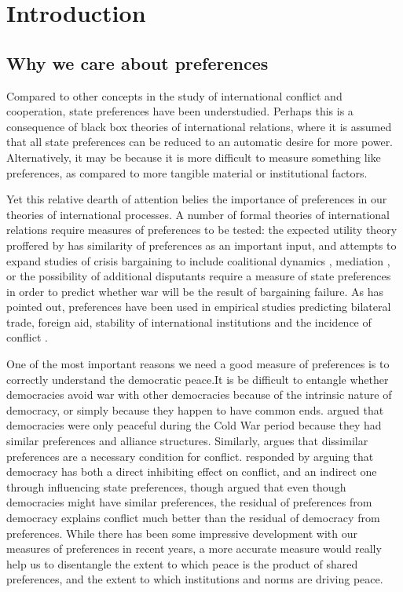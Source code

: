 \setcounter{section}{1}

\section{Introduction}

\subsection{Why we care about preferences}

Compared to other concepts in the study of international conflict and cooperation, state preferences have been understudied. Perhaps this is a consequence of black box theories of international relations, where it is assumed that all state preferences can be reduced to an automatic desire for more power. Alternatively, it may be because it is more difficult to measure something like preferences, as compared to more tangible material or institutional factors.

Yet this relative dearth of attention belies the importance of preferences in our theories of international processes. A number of formal theories of international relations require measures of preferences to be tested: the expected utility theory proffered by \citep{buenodemesquita:1983} has similarity of preferences as an important input, and attempts to expand studies of crisis bargaining to include coalitional dynamics \citep{wolford:2014}, mediation \citep{kydd:2006}, or the possibility of additional disputants \citep{gallop:2017} require a measure of state preferences in order to predict whether war will be the result of bargaining failure. As \citet{hage:2011} has pointed out, preferences have been used in empirical studies predicting bilateral trade, foreign aid, stability of international institutions and the incidence of conflict \citep{kastner:2007, derouen:heo:2004, stone:2004, gartzke:2007, braumoeller:2008}. 

One of the most important reasons we need a good measure of preferences is to correctly understand the democratic peace.It is be difficult to entangle whether democracies avoid war with other democracies because of the intrinsic nature of democracy, or simply because they happen to have common ends. \citet{gowa:farber:year} argued that democracies were only peaceful during the Cold War period because they had similar preferences and alliance structures. Similarly, \citet{gartzke:year} argues that dissimilar preferences are a necessary condition for conflict. \citet{oneal:russett:1998} responded by arguing that democracy has both a direct inhibiting effect on conflict, and an indirect one through influencing state preferences, though \citet{gartzke:year} argued that even though democracies might have similar preferences, the residual of preferences from democracy explains conflict much better than the residual of democracy from preferences. While there has been some impressive development with our measures of preferences in recent years, a more accurate measure would really help us to disentangle the extent to which peace is the product of shared preferences, and the extent to which institutions and norms are driving peace.

